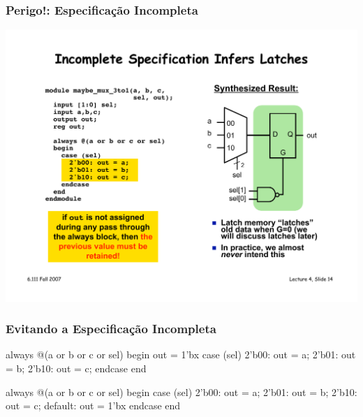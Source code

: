 \begin{frame}[fragile]
	\frametitle{Perigo!: Especificação Incompleta}
    \includegraphics[scale=.5]{figs/Mux3to1Latch}
\end{frame}

\begin{frame}[fragile]
	\frametitle{Evitando a Especificação Incompleta}
	\begin{verilogcode}
  always @(a or b or c or sel)
  begin
    out = 1'bx
    case (sel)
      2'b00: out = a;
      2'b01: out = b;
      2'b10: out = c;
    endcase
  end
    \end{verilogcode}
	\begin{verilogcode}
  always @(a or b or c or sel)
  begin
    case (sel)
      2'b00: out = a;
      2'b01: out = b;
      2'b10: out = c;
      default: out = 1'bx
    endcase
  end
    \end{verilogcode}
\end{frame}

